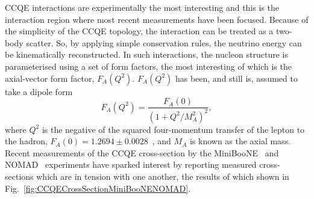 \newline
\newline
CCQE interactions are experimentally the most interesting and this is the interaction region where most recent measurements have been focused.  Because of the simplicity of the CCQE topology, the interaction can be treated as a two-body scatter.  So, by applying simple conservation rules, the neutrino energy can be kinematically reconstructed.  In such interactions, the nucleon structure is parameterised using a set of form factors, the most interesting of which is the axial-vector form factor, $F_A(Q^2)$. $F_A(Q^2)$ has been, and still is, assumed to take a dipole form
\begin{equation}
F_A(Q^2) = \frac{F_A(0)}{(1+Q^2/M_A^2)^2}
\label{eq:FAFormFactor},
\end{equation}
where $Q^2$ is the negative of the squared four-momentum transfer of the lepton to the hadron, $F_A(0) = 1.2694\pm0.0028$~\cite{0954-3899-37-7A-075021}, and $M_A$ is known as the axial mass.  Recent measurements of the CCQE cross-section by the MiniBooNE~\cite{PhysRevD.81.092005} and NOMAD~\cite{NOMAD-CCQE} experiments have sparked interest by reporting measured cross-sections which are in tension with one another, the results of which shown in Fig.~\ref{fig:CCQECrossSectionMiniBooNENOMAD}.  
